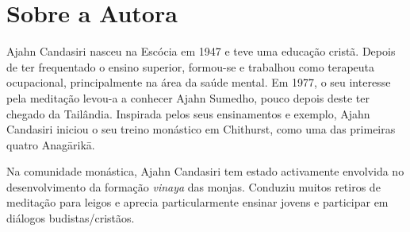 \chapter{Sobre a Autora}

Ajahn Candasiri nasceu na Escócia em 1947 e teve uma educação cristã.
Depois de ter frequentado o ensino superior, formou-se e trabalhou como
terapeuta ocupacional, principalmente na área da saúde mental. Em 1977,
o seu interesse pela meditação levou-a a conhecer Ajahn Sumedho, pouco
depois deste ter chegado da Tailândia. Inspirada pelos seus ensinamentos
e exemplo, Ajahn Candasiri iniciou o seu treino monástico em Chithurst,
como uma das primeiras quatro Anagārikā.

Na comunidade monástica, Ajahn Candasiri tem estado activamente
envolvida no desenvolvimento da formação \emph{vinaya} das monjas.
Conduziu muitos retiros de meditação para leigos e aprecia
particularmente ensinar jovens e participar em diálogos
budistas/cristãos.
